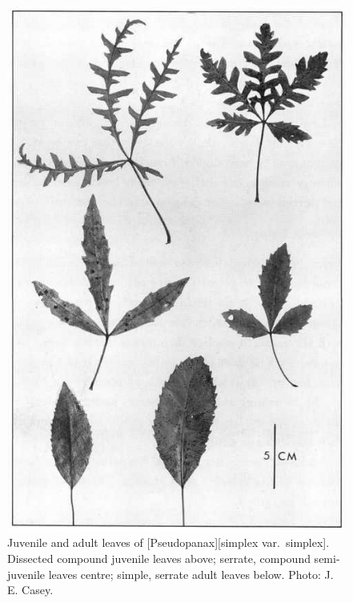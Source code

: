 \begin{figure}[!htb]
	\centering
	\begin{minipage}[t]{0.516\textwidth}
		\centering
		\includegraphics[width=\textwidth]{graphics/figure18pseudopanax.jpg}
    	\caption[Juvenile and adult leaves of \emph{Pseudopanax simplex var.\ simplex}]{Juvenile and adult leaves of [Pseudopanax][simplex var.\ simplex].
        Dissected compound juvenile leaves above; serrate, compound semi-juvenile leaves centre; simple, serrate adult leaves below.
    	Photo: J. E. Casey.}%
    	\label{fig:18pseudopanax}
	\end{minipage}\hfill%
	\begin{minipage}[t]{0.464\textwidth}
    	\centering

\end{minipage}
\end{figure}
